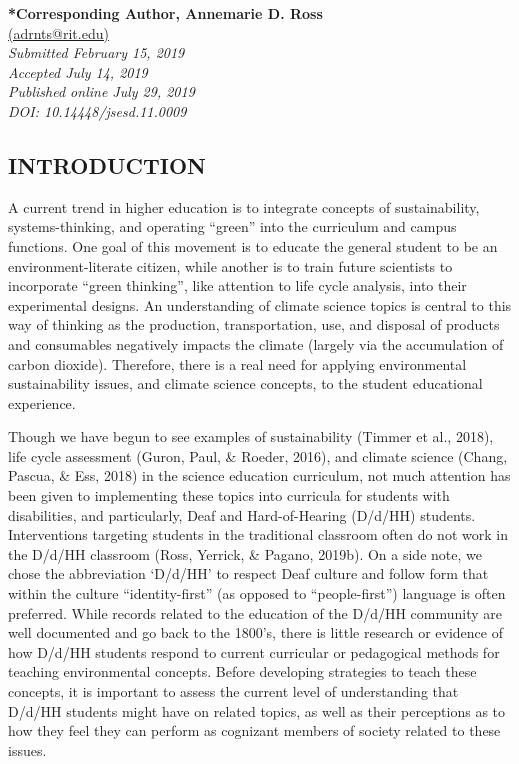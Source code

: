 \documentclass[11.5pt]{sig-alternate} %
\begin{document}
\textbf{*Corresponding Author, Annemarie D. Ross}\\
\href{mailto:  adrnts@rit.edu}{ (adrnts@rit.edu)} \\
\textit{Submitted  February 15, 2019}\\
\textit{Accepted July 14, 2019} \\
\textit{Published online July 29, 2019} \\
\textit{DOI: 10.14448/jsesd.11.0009} \\
\pagebreak
\clearpage
\begin{large}

\section*{INTRODUCTION}

A current trend in higher education is to integrate concepts of sustainability, systems-thinking, and operating “green” into the curriculum and campus functions.  One goal of this movement is to educate the general student to be an environ\-ment-literate citizen, while another is to train future scientists to incorporate “green thinking”, like attention to life cycle analysis, into their experimental designs. An understanding of climate science topics is central to this way of thinking as the production, transportation, use, and disposal of products and consumables negatively impacts the climate (largely via the accumulation of carbon dioxide).  Therefore, there is a real need for applying environmental sustainability issues, and climate science concepts, to the student educational experience.

Though we have begun to see examples of sustainability (Timmer et al., 2018), life cycle assessment (Guron, Paul, \& Roeder, 2016), and climate science (Chang, Pascua, \& Ess, 2018) in the science education curriculum, not much attention has been given to implementing these topics into curricula for students with disabilities, and particularly, Deaf and Hard-of-Hearing (D/d/HH) students. Interventions targeting students in the traditional classroom often do not work in the D/d/HH classroom (Ross, Yerrick, \& Pagano, 2019b). On a side note, we chose the abbreviation ‘D/d/HH’ to respect Deaf culture and follow form that within the culture “identity-first” (as opposed to “people-first”) language is often preferred. While records related to the education of the D/d/HH community are well documented and go back to the 1800’s, there is little research or evidence of how D/d/HH students respond to current curricular or pedagogical methods for teaching environmental concepts. Before developing strategies to teach these concepts, it is important to assess the current level of understanding that D/d/HH students might have on related topics, as well as their perceptions as to how they feel they can perform as cognizant members of society related to these issues.


\end{large}
\end{document}
